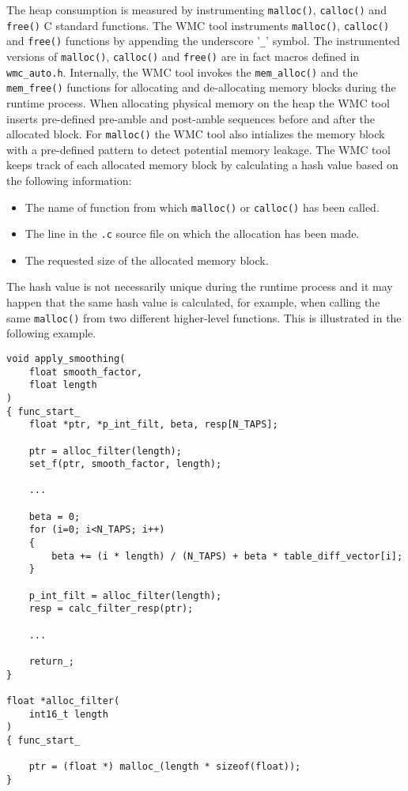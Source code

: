 The heap consumption is measured by instrumenting \verb|malloc()|, \verb|calloc()| and \verb|free()| C standard functions. The WMC tool instruments \verb|malloc()|, \verb|calloc()| and \verb|free()| functions by appending the underscore '\verb|_|' symbol. The instrumented versions of \verb|malloc()|, \verb|calloc()| and \verb|free()| are in fact macros defined in \verb|wmc_auto.h|. Internally, the WMC tool invokes the \verb|mem_alloc()| and the \verb|mem_free()| functions for allocating and de-allocating memory blocks during the runtime process. When allocating physical memory on the heap the WMC tool inserts pre-defined pre-amble and post-amble sequences before and after the allocated block. For \verb|malloc()| the WMC tool also intializes the memory block with a pre-defined pattern to detect potential memory leakage. The WMC tool keeps track of each allocated memory block by calculating a hash value based on the following information:

\begin{itemize}
  \item The name of function from which \verb|malloc()| or \verb|calloc()| has been called.
  \item The line in the \verb|.c| source file on which the allocation has been made.
  \item The requested size of the allocated memory block.
\end{itemize}

The hash value is not necessarily unique during the runtime process and it may happen that the same hash value is calculated, for example, when calling the same \verb|malloc()| from two different higher-level functions. This is illustrated in the following example.

\begin{Verbatim}[fontsize=\small]
void apply_smoothing(
    float smooth_factor,
    float length
)
{ func_start_
    float *ptr, *p_int_filt, beta, resp[N_TAPS];

    ptr = alloc_filter(length);
    set_f(ptr, smooth_factor, length);
    
    ...

    beta = 0;
    for (i=0; i<N_TAPS; i++)
    {
        beta += (i * length) / (N_TAPS) + beta * table_diff_vector[i];
    }
    
    p_int_filt = alloc_filter(length);
    resp = calc_filter_resp(ptr);
    
    ...

    return_;
}

float *alloc_filter(
    int16_t length
)
{ func_start_

    ptr = (float *) malloc_(length * sizeof(float));
}      
\end{Verbatim}

